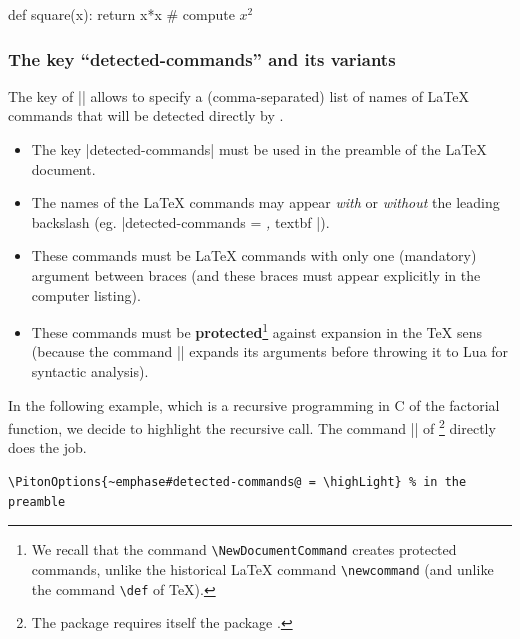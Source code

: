 \documentclass{article}
\begin{document}
\begin{Piton}
def square(x):
    return x*x # compute $x^2$
\end{Piton}

\subsubsection{The key ``detected-commands'' and its variants}

\label{raw-detected-commands}
\label{vertical-detected-commands}
\label{detected-commands}

The key  of |\PitonOptions| allows to specify a
(comma-separated) list of names of LaTeX commands that will be detected 
directly by .

\begin{itemize}
\item The key |detected-commands| must be used in the preamble of the LaTeX document.

\item The names of the LaTeX commands may appear \emph{with} or \emph{without}
the leading backslash (eg. |detected-commands = { \emph, textbf }|).

\item These commands must be LaTeX commands with only one (mandatory) argument
between braces (and these braces must appear explicitly in the computer
listing). 

\item These commands must be \textbf{protected}\footnote{We recall that the
command \texttt{\textbackslash NewDocumentCommand} creates protected commands,
unlike the historical LaTeX command \texttt{\textbackslash newcommand} (and
unlike the command \texttt{\textbackslash def} of TeX).} against expansion in
the TeX sens (because the command |\piton| expands its arguments before
throwing it to Lua for syntactic analysis).
\end{itemize}

\bigskip
In the following example, which is a recursive programming in C of the
factorial function, we decide to highlight the recursive call. The command
|\highLight| of \footnote{The package  requires itself
the package .} directly does the job.

\medskip
\begin{footnotesize}
\begin{Verbatim}
\PitonOptions{~emphase#detected-commands@ = \highLight} % in the preamble
\end{Verbatim}
\end{footnotesize}
\end{document}
